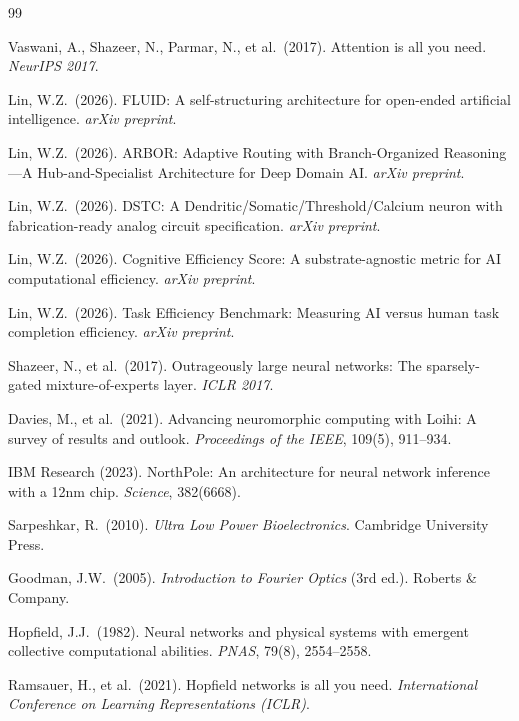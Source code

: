 \documentclass[12pt]{article}
\begin{document}
\begin{thebibliography}{99}

 Vaswani, A., Shazeer, N., Parmar, N., et al.\ (2017). Attention is all you need. \textit{NeurIPS 2017}.

 Lin, W.Z.\ (2026). FLUID: A self-structuring architecture for open-ended artificial intelligence. \textit{arXiv preprint}.

 Lin, W.Z.\ (2026). ARBOR: Adaptive Routing with Branch-Organized Reasoning---A Hub-and-Specialist Architecture for Deep Domain AI. \textit{arXiv preprint}.

 Lin, W.Z.\ (2026). DSTC: A Dendritic/Somatic/Threshold/Calcium neuron with fabrication-ready analog circuit specification. \textit{arXiv preprint}.

 Lin, W.Z.\ (2026). Cognitive Efficiency Score: A substrate-agnostic metric for AI computational efficiency. \textit{arXiv preprint}.

 Lin, W.Z.\ (2026). Task Efficiency Benchmark: Measuring AI versus human task completion efficiency. \textit{arXiv preprint}.

 Shazeer, N., et al.\ (2017). Outrageously large neural networks: The sparsely-gated mixture-of-experts layer. \textit{ICLR 2017}.

 Davies, M., et al.\ (2021). Advancing neuromorphic computing with Loihi: A survey of results and outlook. \textit{Proceedings of the IEEE}, 109(5), 911--934.

 IBM Research (2023). NorthPole: An architecture for neural network inference with a 12nm chip. \textit{Science}, 382(6668).

 Sarpeshkar, R.\ (2010). \textit{Ultra Low Power Bioelectronics}. Cambridge University Press.

 Goodman, J.W.\ (2005). \textit{Introduction to Fourier Optics} (3rd ed.). Roberts \& Company.

 Hopfield, J.J.\ (1982). Neural networks and physical systems with emergent collective computational abilities. \textit{PNAS}, 79(8), 2554--2558.

 Ramsauer, H., et al.\ (2021). Hopfield networks is all you need. \textit{International Conference on Learning Representations (ICLR)}.


\end{thebibliography}
\end{document}
